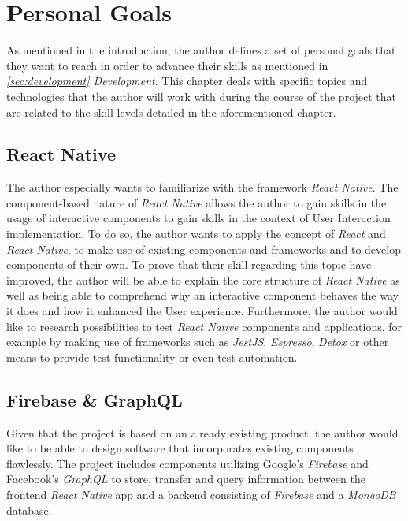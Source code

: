\section{Personal Goals}
\label{sec:personal}

As mentioned in the introduction, the author defines a set of personal goals that they want to reach in order to advance their skills as mentioned in \textit{\ref{sec:development} Development}. This chapter deals with specific topics and technologies that the author will work with during the course of the project that are related to the skill levels detailed in the aforementioned chapter.

\subsection{React Native}

The author especially wants to familiarize with the framework \textit{React Native}. The component-based nature of \textit{React Native} allows the author to gain skills in the usage of interactive components to gain skills in the context of User Interaction implementation. To do so, the author wants to apply the concept of \textit{React} and \textit{React Native}, to make use of existing components and frameworks and to develop components of their own.
\newline
To prove that their skill regarding this topic have improved, the author will be able to explain the core structure of \textit{React Native} as well as being able to comprehend why an interactive component behaves the way it does and how it enhanced the User experience. Furthermore, the author would like to research possibilities to test \textit{React Native} components and applications, for example by making use of frameworks such as \textit{JestJS}, \textit{Espresso}, \textit{Detox} or other means to provide test functionality or even test automation.

\subsection{Firebase \& GraphQL}

Given that the project is based on an already existing product, the author would like to be able to design software that incorporates existing components flawlessly. The project includes components utilizing Google's \textit{Firebase} and Facebook's \textit{GraphQL} to store, transfer and query information between the frontend \textit{React Native} app and a backend consisting of \textit{Firebase} and a \textit{MongoDB} database.

